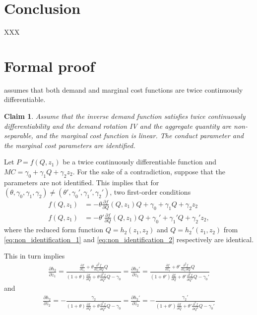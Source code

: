 \documentclass[11pt, a4paper]{article}
\newtheorem{claim}{Claim}
\begin{document}
\section{Conclusion}

XXX

\appendix


\section{Formal proof}
\citet{lau1982identifying} assumes that both demand and marginal cost functions are twice continuously differentiable.

\begin{claim}
Assume that the inverse demand function satisfies twice continuously differentiability and the demand rotation IV and the aggregate quantity are non-separable, and the marginal cost function is linear. The conduct parameter and the marginal cost parameters are identified.
\end{claim}

Let $P = f(Q,z_1)$ be a twice continuously differentiable function and $MC = \gamma_0 + \gamma_1 Q + \gamma_2 z_2$.
For the sake of a contradiction, suppose that the parameters are not identified. This implies that for $(\theta, \gamma_0, \gamma_1, \gamma_2)\ne (\theta', \gamma_0', \gamma_1', \gamma_2')$, two first-order conditions
\begin{align}
    f(Q,z_1) &= - \theta \frac{\partial f}{\partial Q}(Q,z_1) Q + \gamma_0 + \gamma_1 Q + \gamma_2 z_2 \label{eq:non_identification_1}\\
    f(Q,z_1) &= - \theta' \frac{\partial f}{\partial Q}(Q,z_1) Q + \gamma_0' + \gamma_1' Q + \gamma_2' z_2 \label{eq:non_identification_2},
\end{align}
where the reduced form function $Q= h_2(z_1,z_2)$ and $Q= h_2'(z_1,z_2)$ from \eqref{eq:non_identification_1} and \eqref{eq:non_identification_2} respectively are identical.

This in turn implies
\begin{align}\label{eq:equivalence_1}
    \frac{\partial h_2}{\partial z_1} = \frac{\frac{\partial f}{\partial z_1} + \theta \frac{\partial^2 f}{\partial z_1\partial Q}Q}{(1 + \theta)\frac{\partial f}{\partial Q} + \theta \frac{\partial^2 f}{\partial Q^2}Q - \gamma_0} = \frac{\partial h_2'}{\partial z_1} = \frac{\frac{\partial f}{\partial z_1} + \theta' \frac{\partial^2 f}{\partial z_1\partial Q}Q}{(1 + \theta')\frac{\partial f}{\partial Q} + \theta' \frac{\partial^2 f}{\partial Q^2}Q - \gamma_0'}
\end{align}
and 
\begin{align}\label{eq:equivalence_2}
    \frac{\partial h_2}{\partial z_2} = -\frac{\gamma_2}{(1 + \theta)\frac{\partial f}{\partial Q} + \theta \frac{\partial^2 f}{\partial Q^2}Q - \gamma_0} = \frac{\partial h_2'}{\partial z_2} = -\frac{\gamma_2'}{(1 + \theta')\frac{\partial f}{\partial Q} + \theta' \frac{\partial^2 f}{\partial Q^2}Q - \gamma_0'}
\end{align}
\end{document}
